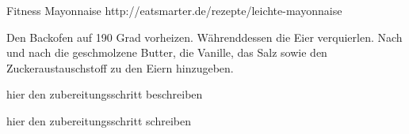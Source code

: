 \begin{recipe}[]{ Fitness Mayonnaise }{ http://eatsmarter.de/rezepte/leichte-mayonnaise }{  }



\step
Den Backofen auf 190 Grad vorheizen. Währenddessen die Eier verquierlen. Nach und nach die geschmolzene Butter, die Vanille, das Salz sowie den Zuckeraustauschstoff zu den Eiern hinzugeben. 

\step
hier den zubereitungsschritt beschreiben


\step
hier den zubereitungsschritt schreiben


\end{recipe}